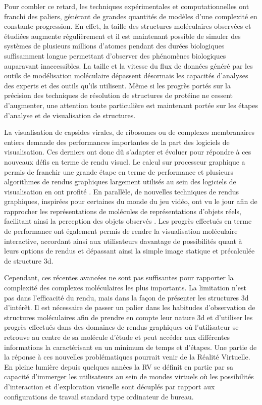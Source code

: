 Pour combler ce retard, les techniques expérimentales et computationnelles ont franchi des paliers, générant de grandes quantités de modèles d'une complexité en constante progression. En effet, la taille des structures moléculaires observées et étudiées augmente régulièrement et il est maintenant possible de simuler des systèmes de plusieurs millions d'atomes pendant des durées biologiques suffisamment longue permettant d'observer des phénomènes biologiques auparavant inaccessibles. La taille et la vitesse du flux de données généré par les outils de modélisation moléculaire dépassent désormais les capacités d'analyses des experts et des outils qu'ils utilisent. Même si les progrès portés sur la précision des techniques de résolution de structures de protéine ne cessent d'augmenter, une attention toute particulière est maintenant portée sur les étapes d'analyse et de visualisation de structures.

La visualisation de capsides virales, de ribosomes ou de complexes membranaires entiers demande des performances importantes de la part des logiciels de visualisation. Ces derniers ont donc dû s'adapter et évoluer pour répondre à ces nouveaux défis en terme de rendu visuel. Le calcul sur processeur graphique a permis de franchir une grande étape en terme de performance et plusieurs algorithmes de rendus graphiques largement utilisés au sein des logiciels de visualisation en ont profité \cite{chavent_gpu-powered_2011}. En parallèle, de nouvelles techniques de rendus graphiques, inspirées pour certaines du monde du jeu vidéo, ont vu le jour afin de rapprocher les représentations de molécules de représentations d'objets réels, facilitant ainsi la perception des objets observés \cite{lv_game_2013}. Les progrès effectués en terme de performance ont également permis de rendre la visualisation moléculaire interactive,  accordant ainsi aux utilisateurs davantage de possibilités quant à leurs options de rendus et dépassant ainsi la simple image statique et précalculée de structure 3d.

Cependant, ces récentes avancées ne sont pas suffisantes pour rapporter la complexité des complexes moléculaires les plus importants. La limitation n'est pas dans l'efficacité du rendu, mais dans la façon de présenter les structures 3d d'intérêt. Il est nécessaire de passer un palier dans les habitudes d'observation de structures moléculaires afin de prendre en compte leur nature 3d et d'utiliser les progrès effectués dans des domaines de rendus graphiques où l'utilisateur se retrouve au centre de sa molécule d'étude et peut accéder aux différentes informations la caractérisant en un minimum de temps et d'étapes. Une partie de la réponse à ces nouvelles problématiques pourrait venir de la Réalité Virtuelle. En pleine lumière depuis quelques années la RV se définit en partie par sa capacité d'immerger les utilisateurs au sein de mondes virtuels où les possibilités d'interaction et d'exploration visuelle sont décuplés par rapport aux configurations de travail standard type ordinateur de bureau.

